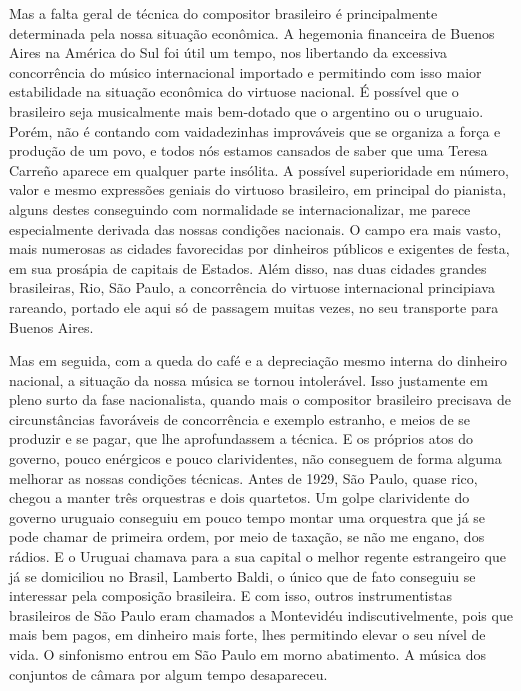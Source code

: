Mas a falta geral de técnica do compositor brasileiro é principalmente
determinada pela nossa situação econômica. A hegemonia financeira de
Buenos Aires na América do Sul foi útil um tempo, nos libertando da
excessiva concorrência do músico internacional importado e permitindo
com isso maior estabilidade na situação econômica do virtuose nacional.
É possível que o brasileiro seja musicalmente mais bem-dotado que o
argentino ou o uruguaio. Porém, não é contando com vaidadezinhas
improváveis que se organiza a força e produção de um povo, e todos nós
estamos cansados de saber que uma Teresa Carreño aparece em qualquer
parte insólita. A possível superioridade em número, valor e mesmo
expressões geniais do virtuoso brasileiro, em principal do pianista,
alguns destes conseguindo com normalidade se internacionalizar, me
parece especialmente derivada das nossas condições nacionais. O campo
era mais vasto, mais numerosas as cidades favorecidas por dinheiros
públicos e exigentes de festa, em sua prosápia de capitais de Estados.
Além disso, nas duas cidades grandes brasileiras, Rio, São Paulo, a
concorrência do virtuose internacional principiava rareando, portado ele
aqui só de passagem muitas vezes, no seu transporte para Buenos Aires.

Mas em seguida, com a queda do café e a depreciação mesmo interna do
dinheiro nacional, a situação da nossa música se tornou intolerável.
Isso justamente em pleno surto da fase nacionalista, quando mais o
compositor brasileiro precisava de circunstâncias favoráveis de
concorrência e exemplo estranho, e meios de se produzir e se pagar, que
lhe aprofundassem a técnica. E os próprios atos do governo, pouco
enérgicos e pouco clarividentes, não conseguem de forma alguma melhorar
as nossas condições técnicas. Antes de 1929, São Paulo, quase rico,
chegou a manter três orquestras e dois quartetos. Um golpe clarividente
do governo uruguaio conseguiu em pouco tempo montar uma orquestra que já
se pode chamar de primeira ordem, por meio de taxação, se não me engano,
dos rádios. E o Uruguai chamava para a sua capital o melhor regente
estrangeiro que já se domiciliou no Brasil, Lamberto Baldi, o único que
de fato conseguiu se interessar pela composição brasileira. E com isso,
outros instrumentistas brasileiros de São Paulo eram chamados a
Montevidéu indiscutivelmente, pois que mais bem pagos, em dinheiro mais
forte, lhes permitindo elevar o seu nível de vida. O sinfonismo entrou
em São Paulo em morno abatimento. A música dos conjuntos de câmara por
algum tempo desapareceu.

